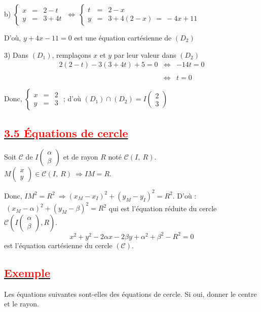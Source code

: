 \documentclass[12pt]{article}
\begin{document}
b) $\left\lbrace\begin{array}{rcl} x&=&2-t \\ y&=&3+4t\end{array}\right.\ \Leftrightarrow\ \left\lbrace\begin{array}{rcl} t&=&2-x \\ y&=&3+4(2-x)\ =\ -4x+11\end{array}\right.$

D'où, $y+4x-11=0$ est une équation cartésienne de $(D_{2})$

3) Dans $(D_{1})$, remplaçons $x$ et $y$ par leur valeur dans $(D_{2})$
	$$\begin{array}{rcl} 2(2-t)-3(3+4t)+5=0&\Leftrightarrow&-14t=0\\\\&\Leftrightarrow&t=0\end{array}$$
	
Donc, $\left\lbrace\begin{array}{rcl} x&=&2 \\ y&=&3\end{array}\right.$ ; d'où $(D_{1})\cap(D_{2})=I\begin{pmatrix} 2 \\ 3\end{pmatrix}$
\subsection*{\underline{\textcolor{red}{\textbf{3.5 Équations de cercle}}}}
Soit $\mathcal{C}$ de $I\begin{pmatrix}
	\alpha\\
	\beta
	\end{pmatrix}$ et de rayon $R$ noté $\mathcal{C}(I,\ R).$
	$M\begin{pmatrix}
	x\\
	y
	\end{pmatrix}\in\mathcal{C}(I,\ R) \: \Rightarrow IM=R.$
	
Donc, $IM^{2}=R^{2} \: \Longrightarrow (x_{M}-x_{I})^{2}+(y_{M}-y_{I})^{2}=R^{2}.$
	D'où : $\ (x_{M}-\alpha)^{2}+(y_{M}-\beta)^{2}=R^{2}$ qui est l'équation réduite du cercle $\mathcal{C}\left(I\begin{pmatrix}
	\alpha\\
	\beta
	\end{pmatrix}, R\right).$
	$$x^{2}+y^{2}-2\alpha x-2\beta y+\alpha^{2}+\beta^{2}-R^{2}=0$$ est l'équation cartésienne du cercle $(\mathcal{C}).$
\subsection*{\underline{\textcolor{red}{\textbf{Exemple}}}}
Les équations suivantes sont-elles des équations de cercle. Si oui, donner le centre et le rayon.
\end{document}
